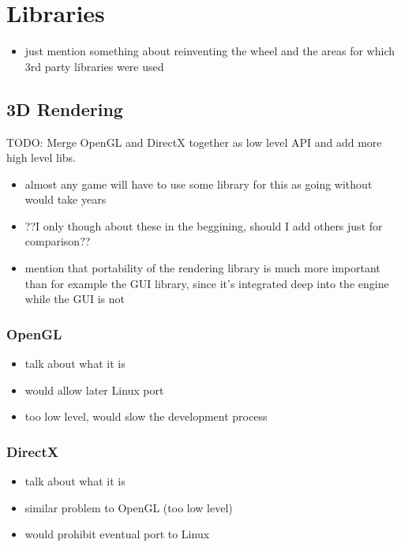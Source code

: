 \iffalse

\section{Libraries}

\begin{itemize}
    \item just mention something about reinventing the wheel and
        the areas for which 3rd party libraries were used
\end{itemize}

\subsection{3D Rendering}

TODO: Merge OpenGL and DirectX together as low level API and add more high level libs.
\begin{itemize}
    \item almost any game will have to use some library for this as
        going without would take years
    \item ??I only though about these in the beggining, should I add
        others just for comparison??
    \item mention that portability of the rendering library is much more
        important than for example the GUI library, since it's integrated
        deep into the engine while the GUI is not
\end{itemize}

\subsubsection{OpenGL}

\begin{itemize}
    \item talk about what it is
    \item would allow later Linux port
    \item too low level, would slow the development process
\end{itemize}

\subsubsection{DirectX}

\begin{itemize}
    \item talk about what it is
    \item similar problem to OpenGL (too low level)
    \item would prohibit eventual port to Linux
\end{itemize}

